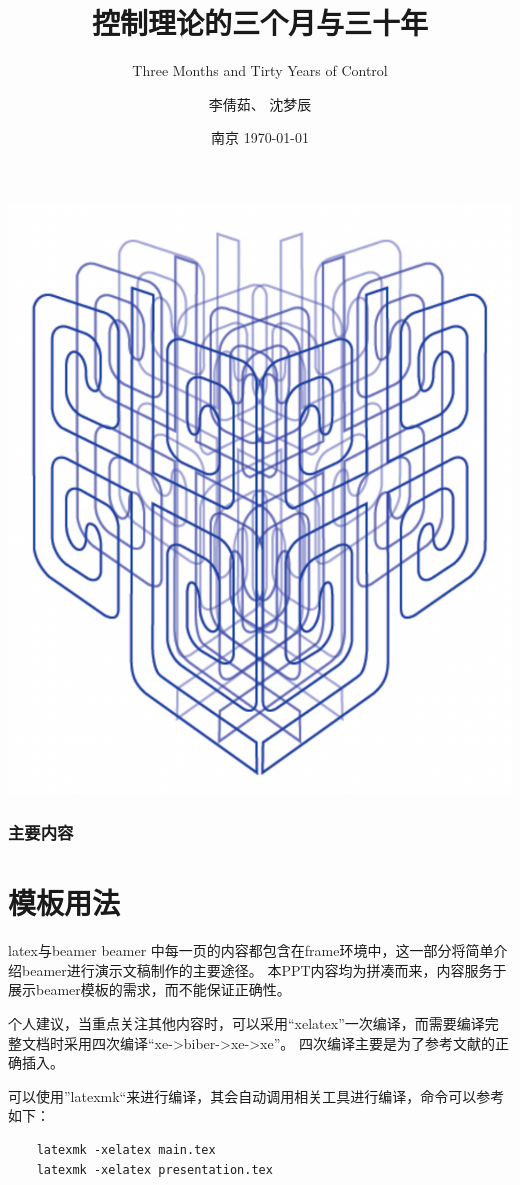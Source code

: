 \documentclass[10pt]{ctexbeamer}
\title[南京邮电大学]{控制理论的三个月与三十年}
\subtitle{Three Months and Tirty Years of Control}
\author[李倩茹]{李倩茹、 沈梦辰}
\institute[自动化学院、人工智能学院]{
南京邮电大学

自动化学院、人工智能学院
}
\date[南京 \today]{南京 \today}
\begin{document}
\frame{\titlepage}

{
    \raggedright
    \includegraphics[trim=-680pt 0 0 -200pt,height=0.8\paperheight]{pic/njupt.pattern.pdf}
}
\begin{frame}
\frametitle{主要内容}
\tableofcontents
\end{frame}

\section{模板用法}

\begin{frame}[fragile=singleslide]{latex与beamer}
  beamer 中每一页的内容都包含在frame环境中，这一部分将简单介绍beamer进行演示文稿制作的主要途径。
  本PPT内容均为拼凑而来，内容服务于展示beamer模板的需求，而不能保证正确性。

  个人建议，当重点关注其他内容时，可以采用“xelatex”一次编译，而需要编译完整文档时采用四次编译“xe->biber->xe->xe”。
  四次编译主要是为了参考文献的正确插入。

  可以使用”latexmk“来进行编译，其会自动调用相关工具进行编译，命令可以参考如下：

  \begin{verbatim}
    latexmk -xelatex main.tex
    latexmk -xelatex presentation.tex
  \end{verbatim}
\end{frame}
\end{document}
